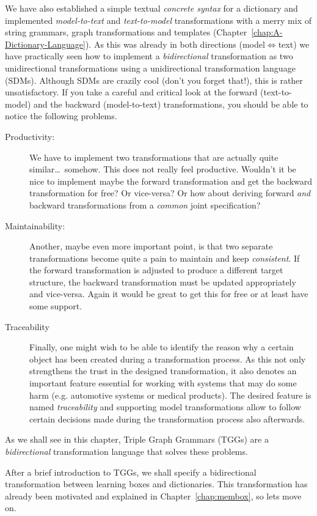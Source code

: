 We have also established a simple textual \emph{concrete syntax} for a dictionary and implemented \emph{model-to-text} and \emph{text-to-model} transformations with a merry mix of string grammars, graph transformations and templates (Chapter~\ref{chap:A-Dictionary-Language}).
As this was already in both directions (model$\Leftrightarrow$text) we have practically seen how to implement a \emph{bidirectional} transformation as two unidirectional transformations using a unidirectional transformation language (SDMs).
Although SDMs are crazily cool (don't you forget that!), this is rather unsatisfactory.  
If you take a careful and critical look at the forward (text-to-model) and the backward (model-to-text) transformations, you should be able to notice the following problems.
\begin{description}
  \item[Productivity:] We have to implement two transformations that are actually quite similar\ldots ~somehow.  This does not really feel productive.  Wouldn't it be nice to implement maybe the forward transformation and get the backward transformation for free?  Or vice-versa?  Or how about deriving forward \emph{and} backward transformations from a \emph{common} joint specification?
  \item[Maintainability:] Another, maybe even more important point, is that two separate transformations become quite a pain to maintain and keep \emph{consistent}.  If the forward transformation is adjusted to produce a different target structure, the backward transformation must be updated appropriately and vice-versa.  Again it would be great to get this for free or at least have some support.
  \item[Traceability] Finally, one might wish to be able to identify the reason why a certain object has been created during a transformation process. As this not only strengthens the trust in the designed transformation, it also denotes an important feature essential for working with systems that may do some harm (e.g. automotive systems or medical products). The desired feature is named \emph{traceability} and supporting model transformations allow to follow certain decisions made during the transformation process also afterwards.
\end{description}

As we shall see in this chapter, Triple Graph Grammars (TGGs) are a \emph{bidirectional} transformation language that solves these problems.

After a brief introduction to TGGs, we shall specify a bidirectional transformation between learning boxes and dictionaries.
This transformation has already been motivated and explained in Chapter~\ref{chap:membox}, so lets move on. 